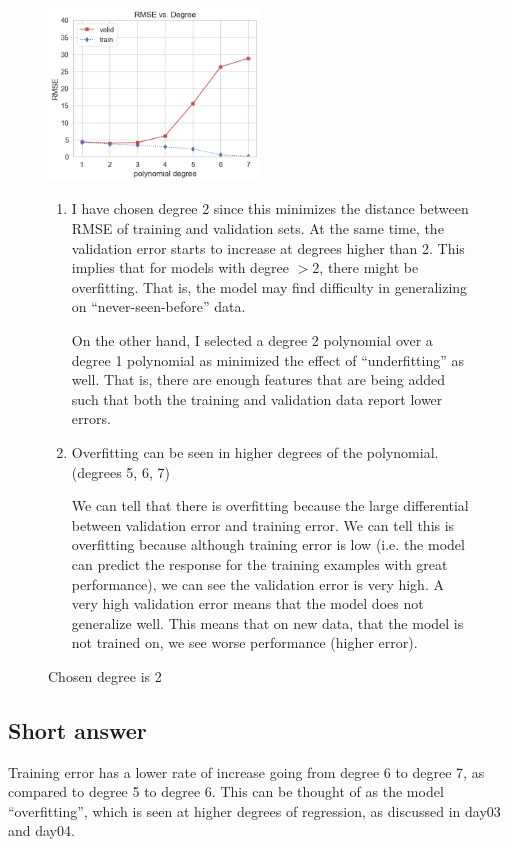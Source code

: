 \documentclass[12pt]{article}
\begin{document}
\begin{figure}[htbp!]
    \centering
    \includegraphics[width=0.5\textwidth]{1c.png}
    \caption{Chosen degree is 2}

    \begin{enumerate}[label=(\roman*)]
        \item I have chosen degree 2 since this minimizes the distance between
        RMSE of training and validation sets. At the same time, the validation
        error starts to increase at degrees higher than 2. This implies that
        for models with degree $> 2$, there might be overfitting. That is, the
        model may find difficulty in generalizing on ``never-seen-before''
        data. 
        
        On the other hand, I selected a degree 2 polynomial over a degree
        1 polynomial as minimized the effect of ``underfitting'' as well. That
        is, there are enough features that are being added such that both the
        training and validation data report lower errors. 

        \item Overfitting can be seen in higher degrees of the polynomial.
        (degrees 5, 6, 7) 
        
        We can tell that there is overfitting because the
        large differential between validation error and training error. We can
        tell this is overfitting because although training error is low (i.e.
        the model can predict the response for the training examples with great
        performance), we can see the validation error is very high. A very high
        validation error means that the model does not generalize well. This
        means that on new data, that the model is not trained on, we see worse
        performance (higher error). 
    \end{enumerate}
\end{figure}

\subsection{Short answer}
Training error has a lower rate of increase going from degree 6 to degree 7, as
compared to degree 5 to degree 6. This can be thought of as the model
``overfitting'', which is seen at higher degrees of regression, as discussed in
day03 and day04. 
\end{document}
